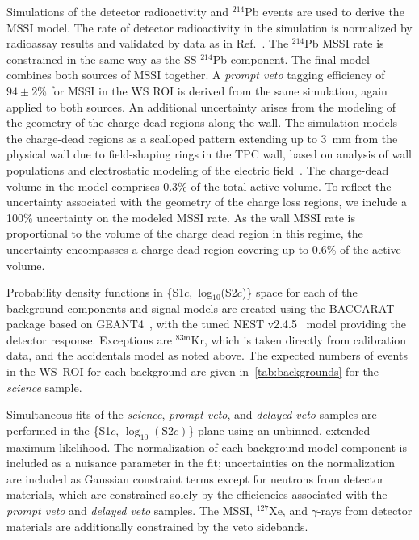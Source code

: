 Simulations of the detector radioactivity and $^{214}$Pb events are used to derive the MSSI model.  The rate of detector radioactivity in the simulation is normalized by radioassay results and validated by data as in Ref.~\cite{LZ:SR1Backgrounds_2022}. The $^{214}$Pb MSSI rate is constrained in the same way as the SS $^{214}$Pb component. The final model combines both sources of MSSI together. 
A \emph{prompt veto} tagging efficiency of $94\pm2$\% for MSSI in the WS ROI is derived from the same simulation, again applied to both sources. An additional uncertainty arises from the modeling of the geometry of the charge-dead regions along the wall. 
The simulation models the charge-dead regions as a scalloped pattern extending up to 3~mm from the physical wall due to field-shaping rings in the TPC wall, based on analysis of wall populations and electrostatic modeling of the electric field~\cite{dey2025a}. 
The charge-dead volume in the model comprises 0.3\% of the total active volume. To reflect the uncertainty associated with the geometry of the charge loss regions, we include a 100\% uncertainty on the modeled MSSI rate. As the wall MSSI rate is proportional to the volume of the charge dead region in this regime, the uncertainty encompasses a charge dead region covering up to $0.6$\% of the active volume. 

 

Probability density functions in \{S1$c$,~log$_{10}$(S2$c$)\} space for each of the background components and signal models are created using the BACCARAT package based on GEANT4~\cite{LZ:simulations_2021, GEANT4:2002zbu, ALLISON2016, Allison:2006ve}, with the tuned NEST v2.4.5~\cite{NEST:paper_2023} model providing the detector response. 
Exceptions are $^{83\text{m}}$Kr, which is taken directly from calibration data, and the accidentals model as noted above. 
The expected numbers of events in the WS~ROI for each background are given in~\autoref{tab:backgrounds} for the \emph{science} sample.

Simultaneous fits of the \emph{science}, \emph{prompt veto}, and \emph{delayed veto} samples 
are performed in the  \{S1$c$, $\log_{10}(\mathrm{S}2c)$\} plane using an unbinned, extended maximum likelihood. 
The normalization of each background model component is included as a nuisance parameter in the fit; uncertainties on the normalization are included as Gaussian constraint terms except for neutrons from detector materials, which
are constrained solely by the efficiencies associated with the \emph{prompt veto} and \emph{delayed veto} samples.
The MSSI, $^{127}$Xe, and $\gamma$-rays from detector materials are additionally constrained by the veto sidebands.


